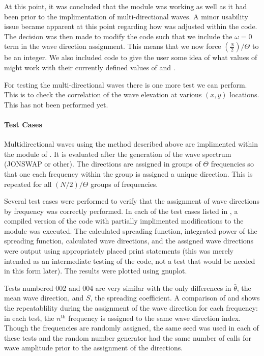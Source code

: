 At this point, it was concluded that the  module was working as well as it had been prior to the implimentation of multi-directional waves.  A minor usability issue became apparent at this point regarding how  was adjusted within the code.  The decision was then made to modify the code such that we include the $\omega = 0$ term in the wave direction assignment.  This means that we now force $(\frac{N}{2})/\Theta$ to be an integer.  We also included code to give the user some idea of what values of  might work with their currently defined values of  and .

For testing the multi-directional waves there is one more test we can perform.  This is to check the correlation of the wave elevation at various $(x,y)$ locations.  This has not been performed yet.



\paragraph*{Test Cases}
Multidirectional waves using the method described above are implimented within the  module of \HD.  It is evaluated after the generation of the wave spectrum (JONSWAP or other).  The directions are assigned in groups of $\Theta$ frequencies so that one each frequency within the group is assigned a unique direction.  This is repeated for all $(N/2)/\Theta$ groups of frequencies.

Several test cases were performed to verify that the assignment of wave directions by frequency was correctly performed.  In each of the test cases listed in , a compiled version of the code with partially implimented modifications to the  module was executed.  The calculated spreading function, integrated power of the spreading function, calculated wave directions, and the assigned wave directions were output using appropriately placed print statements (this was merely intended as an intermediate testing of the code, not a test that would be needed in this form later).  The results were plotted using gnuplot.

Tests numbered 002 and 004 are very similar with the only differences in $\bar\theta$, the mean wave direction, and $S$, the spreading coefficient.  A comparison of  and  shows the repeatablility during the assignment of the wave direction for each frequency: in each test, the $n^\text{th}$ frequency is assigned to the same wave direction index.  Though the frequencies are randomly assigned, the same seed was used in each of these tests and the random number generator had the same number of calls for wave amplitude prior to the assignment of the directions.

